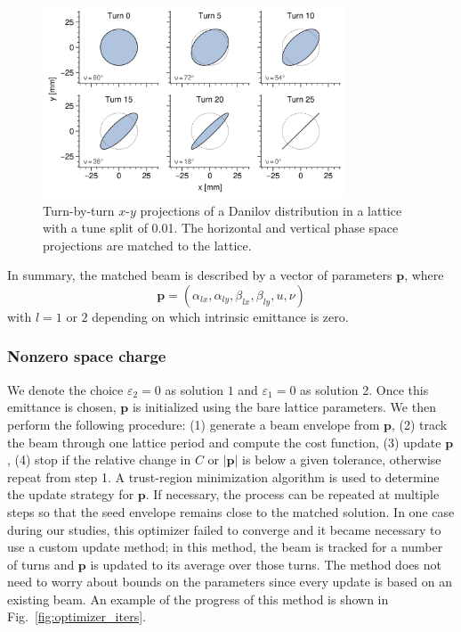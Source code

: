 %
\begin{figure}[!p]
    \centering
    \includegraphics[width=0.8\textwidth]{Images/chapter2/splittunes_tbt.png}
    \caption{Turn-by-turn $x$-$y$ projections of a Danilov distribution in a lattice with a tune split of 0.01. The horizontal and vertical phase space projections are matched to the lattice.}
    \label{fig:splittunes_tbt}
\end{figure}
%
In summary, the matched beam is described by a vector of parameters $\mathbf{p}$, where
%
\begin{equation} \label{eq:twiss_params_4D}
    \mathbf{p} = (\alpha_{lx}, \alpha_{ly}, \beta_{lx}, \beta_{ly}, u, \nu)
\end{equation}
%
with $l = 1$ or $2$ depending on which intrinsic emittance is zero.



\subsubsection{Nonzero space charge}

We denote the choice $\varepsilon_2 = 0$ as solution $1$ and $\varepsilon_1 = 0$ as solution 2. Once this emittance is chosen, $\mathbf{p}$ is initialized using the bare lattice parameters. We then perform the following procedure: (1) generate a beam envelope from $\mathbf{p}$, (2) track the beam through one lattice period and compute the cost function, (3) update $\mathbf{p}$, (4) stop if the relative change in $C$ or $|\mathbf{p}|$ is below a given tolerance, otherwise repeat from step 1. A trust-region minimization algorithm \cite{Branch1999} is used to determine the update strategy for $\mathbf{p}$. If necessary, the process can be repeated at multiple steps so that the seed envelope remains close to the matched solution. In one case during our studies, this optimizer failed to converge and it became necessary to use a custom update method; in this method, the beam is tracked for a number of turns and $\mathbf{p}$ is updated to its average over those turns. The method does not need to worry about bounds on the parameters since every update is based on an existing beam. An example of the progress of this method is shown in Fig.~\ref{fig:optimizer_iters}. 

